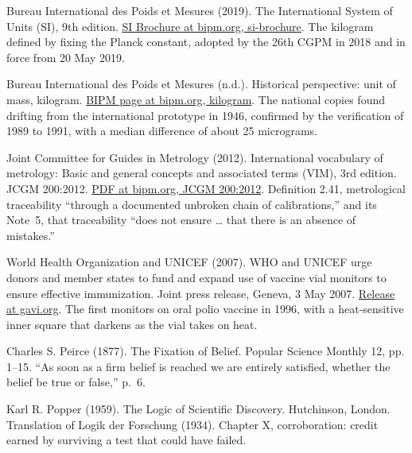 \documentclass[11pt,twoside]{article}
\theoremstyle{thielethm}
\theoremstyle{thieledef}
\theoremstyle{thieledef}
\theoremstyle{thieledef}
\theoremstyle{thielethm}
\theoremstyle{thieleobs}
\theoremstyle{thielethm}
\begin{document}
\noindent Bureau International des Poids et Mesures (2019). The International System of Units (SI), 9th edition. \href{https://www.bipm.org/en/publications/si-brochure}{SI Brochure at bipm.org, si-brochure}. The kilogram defined by fixing the Planck constant, adopted by the 26th CGPM in 2018 and in force from 20 May 2019.
\par\medskip

\noindent Bureau International des Poids et Mesures (n.d.). Historical perspective: unit of mass, kilogram. \href{https://www.bipm.org/en/history-si/kilogram}{BIPM page at bipm.org, kilogram}. The national copies found drifting from the international prototype in 1946, confirmed by the verification of 1989 to 1991, with a median difference of about 25 micrograms.
\par\medskip

\noindent Joint Committee for Guides in Metrology (2012). International vocabulary of metrology: Basic and general concepts and associated terms (VIM), 3rd edition. JCGM 200:2012. \href{https://www.bipm.org/documents/20126/2071204/JCGM_200_2012.pdf}{PDF at bipm.org, JCGM 200:2012}. Definition 2.41, metrological traceability ``through a documented unbroken chain of calibrations,'' and its Note~5, that traceability ``does not ensure \ldots{} that there is an absence of mistakes.''
\par\medskip

\noindent World Health Organization and UNICEF (2007). WHO and UNICEF urge donors and member states to fund and expand use of vaccine vial monitors to ensure effective immunization. Joint press release, Geneva, 3 May 2007. \href{https://www.gavi.org/news/media-room/who-and-unicef-urge-donors-and-member-states-fund-and-expand-use-vaccine-vial}{Release at gavi.org}. The first monitors on oral polio vaccine in 1996, with a heat-sensitive inner square that darkens as the vial takes on heat.
\par\medskip

\noindent Charles S. Peirce (1877). The Fixation of Belief. Popular Science Monthly 12, pp. 1--15. ``As soon as a firm belief is reached we are entirely satisfied, whether the belief be true or false,'' p.~6.
\par\medskip

\noindent Karl R. Popper (1959). The Logic of Scientific Discovery. Hutchinson, London. Translation of Logik der Forschung (1934). Chapter X, corroboration: credit earned by surviving a test that could have failed.
\par\medskip
\end{document}
